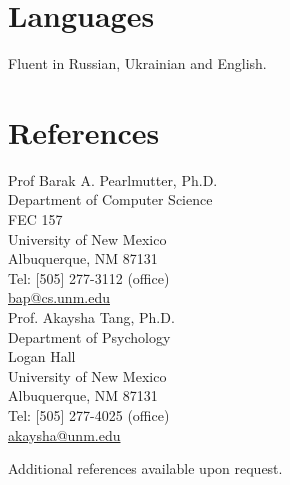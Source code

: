 \documentclass[10pt,overlapped,line]{res}
\begin{document}
\begin{resume}
\section{Languages}
Fluent in Russian, Ukrainian and English. 


\section{References}
 \begin{multicols}{2}
{\small
   Prof Barak A. Pearlmutter, Ph.D. \\
   Department of Computer Science \\
   FEC 157 \\
   University of New Mexico \\
   Albuquerque, NM  87131 \\
   Tel: [505] 277-3112 (office) \\
   \href{URL}{bap@cs.unm.edu} \\

   Prof. Akaysha Tang, Ph.D.\\
   Department of Psychology \\
   Logan Hall \\
   University of New Mexico \\
   Albuquerque, NM 87131 \\
   Tel: [505] 277-4025 (office) \\
   \href{URL}{akaysha@unm.edu} \\
}
\end{multicols}

Additional references available upon request.



\end{resume}
\end{document}
